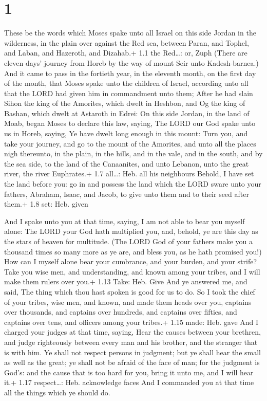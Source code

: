 \hypertarget{section}{%
\section{1}\label{section}}

 These be the words which Moses spake unto all Israel on
this side Jordan in the wilderness, in the plain over against the Red
sea, between Paran, and Tophel, and Laban, and Hazeroth, and Dizahab.+
1.1 the Red\ldots: or, Zuph  (There are eleven days' journey
from Horeb by the way of mount Seir unto Kadesh-barnea.) 
And it came to pass in the fortieth year, in the eleventh month, on the
first day of the month, that Moses spake unto the children of Israel,
according unto all that the LORD had given him in commandment unto them;
 After he had slain Sihon the king of the Amorites, which
dwelt in Heshbon, and Og the king of Bashan, which dwelt at Astaroth in
Edrei:  On this side Jordan, in the land of Moab, began
Moses to declare this law, saying,  The LORD our God spake
unto us in Horeb, saying, Ye have dwelt long enough in this mount:
 Turn you, and take your journey, and go to the mount of the
Amorites, and unto all the places nigh thereunto, in the plain, in the
hills, and in the vale, and in the south, and by the sea side, to the
land of the Canaanites, and unto Lebanon, unto the great river, the
river Euphrates.+ 1.7 all\ldots: Heb. all his neighbours 
Behold, I have set the land before you: go in and possess the land which
the LORD sware unto your fathers, Abraham, Isaac, and Jacob, to give
unto them and to their seed after them.+ 1.8 set: Heb. given

 And I spake unto you at that time, saying, I am not able
to bear you myself alone:  The LORD your God hath
multiplied you, and, behold, ye are this day as the stars of heaven for
multitude.  (The LORD God of your fathers make you a
thousand times so many more as ye are, and bless you, as he hath
promised you!)  How can I myself alone bear your cumbrance,
and your burden, and your strife?  Take you wise men, and
understanding, and known among your tribes, and I will make them rulers
over you.+ 1.13 Take: Heb. Give  And ye answered me, and
said, The thing which thou hast spoken is good for us to do.
 So I took the chief of your tribes, wise men, and known,
and made them heads over you, captains over thousands, and captains over
hundreds, and captains over fifties, and captains over tens, and
officers among your tribes.+ 1.15 made: Heb. gave  And I
charged your judges at that time, saying, Hear the causes between your
brethren, and judge righteously between every man and his brother, and
the stranger that is with him.  Ye shall not respect
persons in judgment; but ye shall hear the small as well as the great;
ye shall not be afraid of the face of man; for the judgment is God's:
and the cause that is too hard for you, bring it unto me, and I will
hear it.+ 1.17 respect\ldots: Heb. acknowledge faces  And I
commanded you at that time all the things which ye should do.

